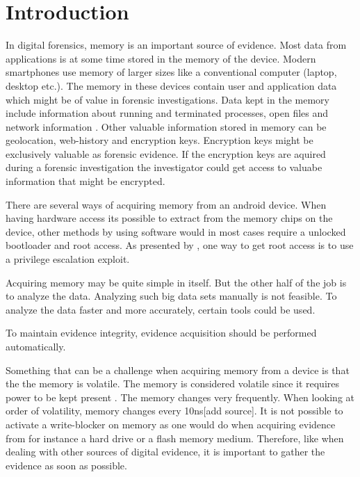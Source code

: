 \section{Introduction}


In digital forensics, memory is an important source of evidence. Most data from applications
is at some time stored in the memory of the device. Modern smartphones use memory of larger sizes like 
a conventional computer (laptop, desktop etc.). The memory in these devices contain user and 
application data which might be of value in forensic investigations. Data kept in the memory include 
information about running and terminated processes, open files and network information 
\cite{acq_vol_android_mem}. Other valuable information stored in memory can be geolocation, web-history 
and encryption keys. Encryption keys might be exclusively valuable as forensic evidence.
If the encryption keys are aquired during a forensic investigation the investigator could get access to 
valuabe information that might be encrypted.

There are several ways of acquiring memory from an android device. When having hardware access its possible to extract from the memory chips on the device, other methods by using software would in most cases require a unlocked bootloader and root access. As presented by \cite{acq_vol_android_mem}, one way to get root access is to use a privilege escalation exploit. %

Acquiring memory may be quite simple in itself. But the other half of the job is to analyze the data.
Analyzing such big data sets manually is not feasible. To analyze the data faster and more accurately, certain tools could be used.


To maintain evidence integrity, evidence acquisition should be performed automatically.

Something that can be a challenge when acquiring memory from a device is that the the memory is 
volatile. The memory is considered volatile since it requires power to be kept present \cite{the_art_of_mem}.
The memory changes very frequently. When looking at order of volatility, memory changes 
every 10ns[add source]. It is not possible to activate a write-blocker on memory as one would do when 
acquiring evidence from for instance a hard drive or a flash memory medium. Therefore, like when dealing with other sources of digital
evidence, it is important to gather the evidence as soon as possible. 

